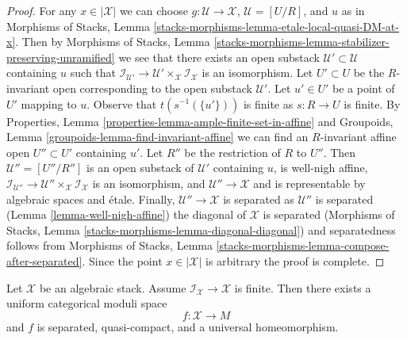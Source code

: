 \begin{proof}
For any $x \in |\mathcal{X}|$ we can choose
$g : \mathcal{U} \to \mathcal{X}$, $\mathcal{U} = [U/R]$, and $u$ as in
Morphisms of Stacks,
Lemma \ref{stacks-morphisms-lemma-etale-local-quasi-DM-at-x}.
Then by
Morphisms of Stacks, Lemma
\ref{stacks-morphisms-lemma-stabilizer-preserving-unramified}
we see that there exists an open substack
$\mathcal{U}' \subset \mathcal{U}$ containing $u$
such that $\mathcal{I}_{\mathcal{U}'} \to
\mathcal{U}' \times_\mathcal{X} \mathcal{I}_\mathcal{X}$
is an isomorphism.
Let $U' \subset U$ be the $R$-invariant open corresponding to
the open substack $\mathcal{U}'$.
Let $u' \in U'$ be a point of $U'$ mapping to $u$.
Observe that $t(s^{-1}(\{u'\}))$ is finite as $s : R \to U$ is finite.
By Properties, Lemma \ref{properties-lemma-ample-finite-set-in-affine}
and Groupoids, Lemma \ref{groupoids-lemma-find-invariant-affine}
we can find an $R$-invariant affine open $U'' \subset U'$
containing $u'$. Let $R''$ be the restriction of $R$ to $U''$.
Then $\mathcal{U}'' = [U''/R'']$ is an open substack of
$\mathcal{U}'$ containing $u$, is well-nigh affine,
$\mathcal{I}_{\mathcal{U}''} \to
\mathcal{U}'' \times_\mathcal{X} \mathcal{I}_\mathcal{X}$
is an isomorphism, and $\mathcal{U}'' \to \mathcal{X}$
and is representable by algebraic spaces and \'etale.
Finally, $\mathcal{U}'' \to \mathcal{X}$ is separated as
$\mathcal{U}''$ is separated (Lemma \ref{lemma-well-nigh-affine})
the diagonal of $\mathcal{X}$ is separated
(Morphisms of Stacks, Lemma \ref{stacks-morphisms-lemma-diagonal-diagonal})
and separatedness follows from Morphisms of Stacks, Lemma
\ref{stacks-morphisms-lemma-compose-after-separated}.
Since the point $x \in |\mathcal{X}|$ is arbitrary the proof is complete.
\end{proof}

\begin{theorem}
\label{theorem-keel-mori}
Let $\mathcal{X}$ be an algebraic stack. Assume
$\mathcal{I}_\mathcal{X} \to \mathcal{X}$ is finite.
Then there exists a uniform categorical moduli space
$$
f : \mathcal{X} \longrightarrow M
$$
and $f$ is separated, quasi-compact, and a universal homeomorphism.
\end{theorem}

